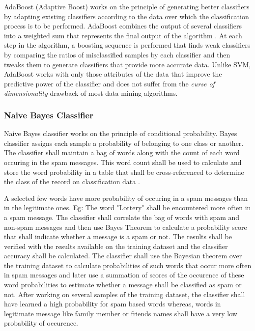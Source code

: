 \documentclass[9pt,twocolumn,twoside]{../../styles/osajnl}
\begin{document}
{AdaBoost (Adaptive Boost) works on the principle of generating better
classifiers by adapting existing classifiers according to the data
over which the classification process is to be performed. AdaBoost
combines the output of several classifiers into a weighted sum that
represents the final output of the algorithm
\cite{www-adaboost-wiki}. At each step in the algorithm, a boosting
sequence is performed that finds weak classifiers by comparing the
ratios of misclassified samples by each classifier and then tweaks
them to generate classifiers that provide more accurate data. Unlike
SVM, AdaBoost works with only those attributes of the data that
improve the predictive power of the classifier and does not suffer
from the \emph{curse of dimensionality}
\cite{www-curseofdimensionality-wiki} drawback of most data mining
algorithms.

\subsubsection{Naive Bayes Classifier}

Naive Bayes classifier works on the principle of conditional
probability. Bayes classifier assigns each sample a probability of
belonging to one class or another. The classifier shall maintain a bag
of words along with the count of each word occuring in the spam
messages. This word count shall be used to calculate and store the
word probability in a table that shall be cross-referenced to
determine the class of the record on classification data
\cite{paper-classification-of-email}.

\noindent
A selected few words have more probability of occuring in a spam
messages than in the legitimate ones. Eg: The word "Lottery" shall be
encountered more often in a spam message.  The classifier shall
correlate the bag of words with spam and non-spam messages and then
use Bayes Theorem to calculate a probability score that shall indicate
whether a message is a spam or not. The results shall be verified with
the results available on the training dataset and the classifier
accuracy shall be calculated. The classifier shall use the Bayesian
theorem over the training dataset to calculate probabilities of such
words that occur more often in spam messages and later use a summation
of scores of the occurence of these word probabilities to estimate
whether a message shall be classified as spam or not. After working on
several samples of the training dataset, the classifier shall have
learned a high probability for spam based words whereas, words in
legitimate message like family member or friends names shall have a
very low probability of occurence.

}
\end{document}
